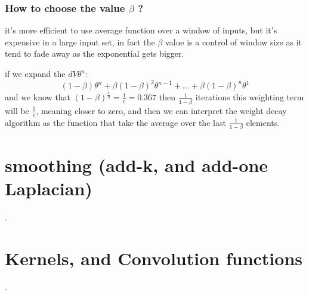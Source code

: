\documentclass[4apaper,12pt]{book}
\begin{document}
\begin{appendices}
\begin{description}
    \subsection {How to choose the value $\beta$ ?}
    \begin{description}
    \item it's more efficient to use average function over a window of inputs, but it's expensive in a large input set, in fact the $\beta$ value is a control of window size as it tend to fade away as the exponential gets bigger.
    \item if we expand the $dV\theta^n$: $$
      (1-\beta)\theta^{n} + \beta(1-\beta)^2\theta^{n-1} + ... + \beta(1-\beta)^{n}\theta^1
      $$ and we know that $(1-\beta)^{\frac{1}{\beta}} = \frac{1}{e} = 0.367$ then $\frac{1}{1-\beta}$ iterations this weighting term will be $\frac{1}{e}$, meaning closer to zero, and then we can interpret the weight decay algorithm as the function that take the average over the last $\frac{1}{1-\beta}$ elements.

    \end{description}
  \end{description}
  \chapter{smoothing (add-k, and add-one Laplacian)}
  \begin{description}
    \item .
    \end{description}
  \chapter{Kernels, and Convolution functions}
  \begin{description}
    \item .
    \end{description}
\end{appendices}
\end{document}

